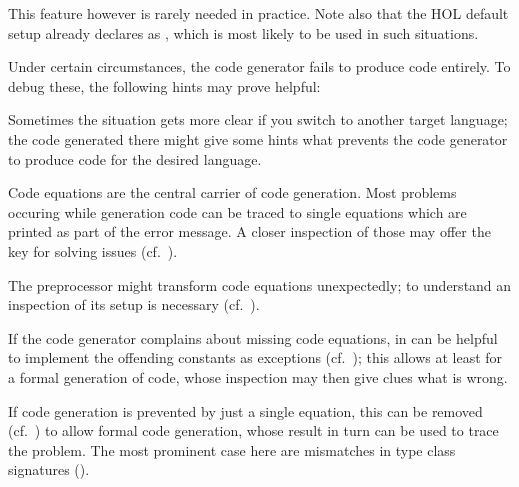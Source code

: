 \begin{isabellebody}
%
\isadelimtypewriter
%
\endisadelimtypewriter
%
\begin{isamarkuptext}%
\noindent This feature however is rarely needed in practice.  Note
  also that the HOL default setup already declares 
  as \hyperlink{command.code-abort}{\mbox{}}, which is most likely to be used in such
  situations.%
\end{isamarkuptext}%
\isamarkuptrue%
%
\isamarkuptrue%
%
\begin{isamarkuptext}%
Under certain circumstances, the code generator fails to produce
  code entirely.  To debug these, the following hints may prove
  helpful:

  \begin{description}

      Sometimes
      the situation gets more clear if you switch to another target
      language; the code generated there might give some hints what
      prevents the code generator to produce code for the desired
      language.

      Code equations are the central
      carrier of code generation.  Most problems occuring while generation
      code can be traced to single equations which are printed as part of
      the error message.  A closer inspection of those may offer the key
      for solving issues (cf.~).

      The preprocessor might
      transform code equations unexpectedly; to understand an
      inspection of its setup is necessary (cf.~).

      If the code generator
      complains about missing code equations, in can be helpful to
      implement the offending constants as exceptions
      (cf.~); this allows at least for a formal
      generation of code, whose inspection may then give clues what is
      wrong.

      If code
      generation is prevented by just a single equation, this can be
      removed (cf.~) to allow formal code
      generation, whose result in turn can be used to trace the
      problem.  The most prominent case here are mismatches in type
      class signatures ().

  \end{description}%
\end{isamarkuptext}%
\isamarkuptrue%
%
\isadelimtheory
%
\endisadelimtheory
%
\isatagtheory
{}\isamarkupfalse%
%
\endisatagtheory
{\isafoldtheory}%
%
\isadelimtheory
%
\endisadelimtheory
\isanewline
\end{isabellebody}%
